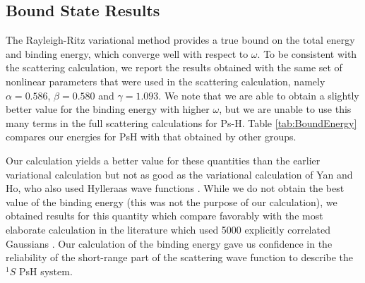 \documentclass[preprint,showpacs,preprintnumbers,amsmath,amssymb]{revtex4}
\begin{document}
\subsection{Bound State Results}

The Rayleigh-Ritz variational method provides a true bound on the total energy and binding energy, which converge well with respect to $\omega$. To be consistent with the scattering calculation, we report the results obtained with the same set of nonlinear parameters that were used in the scattering calculation, namely $\alpha = 0.586$, $\beta = 0.580$ and $\gamma = 1.093$. We note that we are able to obtain a slightly better value for the binding energy with higher $\omega$, but we are unable to use this many terms in the full scattering calculations for Ps-H. Table \ref{tab:BoundEnergy} compares our energies for PsH with that obtained by other groups.

Our calculation yields a better value for these
quantities than the earlier variational calculation \cite{VanReeth2003,VanReeth2004}
but not as good as the variational calculation of
Yan and Ho, who also used Hylleraas wave functions \cite{Yan1999}.
While we do not obtain the best value of the binding energy
(this was not the purpose of our calculation),
we obtained results for this quantity which compare favorably with
the most elaborate calculation in the literature which
used 5000 explicitly correlated Gaussians \cite{Bubin2006}.
Our calculation of the binding energy gave us confidence
in the reliability of the short-range part of the
scattering wave function to describe
the $^1S$ PsH system.
\end{document}
